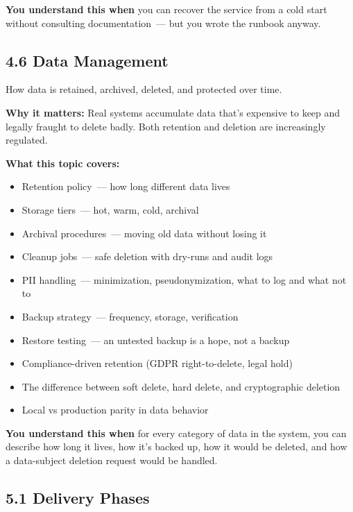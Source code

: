 \noindent{}\textbf{You understand this when} you can recover the service from a cold start without consulting documentation~--- but you wrote the runbook anyway.

\subsection*{4.6 Data Management}\label{project-planning-guide:46-data-management}

How data is retained, archived, deleted, and protected over time.

\textbf{Why it matters:} Real systems accumulate data that's expensive to keep and legally fraught to delete badly. Both retention and deletion are increasingly regulated.

\textbf{What this topic covers:}

\begin{itemize}
\tightlist
\item
  Retention policy~--- how long different data lives
\item
  Storage tiers~--- hot, warm, cold, archival
\item
  Archival procedures~--- moving old data without losing it
\item
  Cleanup jobs~--- safe deletion with dry-runs and audit logs
\item
  PII handling~--- minimization, pseudonymization, what to log and what not to
\item
  Backup strategy~--- frequency, storage, verification
\item
  Restore testing~--- an untested backup is a hope, not a backup
\item
  Compliance-driven retention (GDPR right-to-delete, legal hold)
\item
  The difference between soft delete, hard delete, and cryptographic deletion
\item
  Local vs production parity in data behavior
\end{itemize}

\noindent{}\textbf{You understand this when} for every category of data in the system, you can describe how long it lives, how it's backed up, how it would be deleted, and how a data-subject deletion request would be handled.

\label{project-planning-guide:section-5--delivery--changelog}

\subsection*{5.1 Delivery Phases}\label{project-planning-guide:51-delivery-phases}

